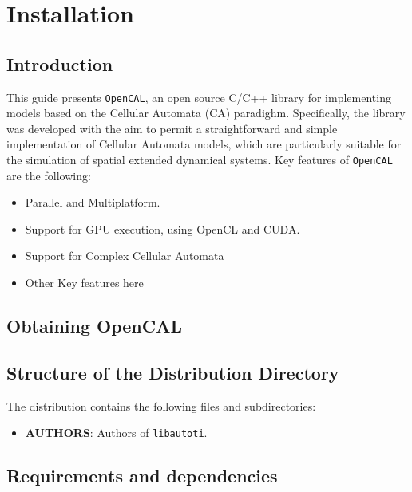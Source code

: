 \chapter{Installation} 
\label{ch:installation}

\section{Introduction}

This guide presents \verb"OpenCAL", an open source C/C++ library
for implementing models based on the Cellular Automata (CA)
paradighm. Specifically, the library was developed with the aim to permit a
straightforward and simple implementation of Cellular Automata models, which are
particularly suitable for the simulation of spatial extended dynamical systems.
Key features of \verb"OpenCAL" are the
following:

\begin{itemize}
    \item Parallel and Multiplatform. 
    
    \item Support for GPU execution, using OpenCL and CUDA.
    
    \item Support for Complex Cellular Automata 
    
    \item Other Key features here 
\end{itemize}


\section{Obtaining OpenCAL}



\section{Structure of the Distribution Directory}

The distribution contains the following files and subdirectories:

\begin{itemize}

    \item \textbf{AUTHORS}: Authors of \verb"libautoti".


\end{itemize}


\section{Requirements and dependencies}

